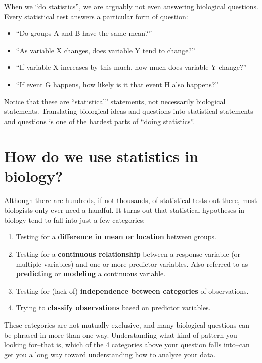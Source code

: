 \documentclass[
  13,
  letterpaper,
]{report}
\begin{document}
When we ``do statistics'', we are arguably not even answering biological
questions. Every statistical test answers a particular form of question:

\begin{itemize}
\item
  ``Do groups A and B have the same mean?''
\item
  ``As variable X changes, does variable Y tend to change?''
\item
  ``If variable X increases by this much, how much does variable Y
  change?''
\item
  ``If event G happens, how likely is it that event H also happens?''
\end{itemize}

Notice that these are ``statistical'' statements, not necessarily
biological statements. Translating biological ideas and questions into
statistical statements and questions is one of the hardest parts of
``doing statistics''.

\section{How do we use statistics in biology?}\label{sec-01-tests}

Although there are hundreds, if not thousands, of statistical tests out
there, most biologists only ever need a handful. It turns out that
statistical hypotheses in biology tend to fall into just a few
categories:

\begin{enumerate}
\def\labelenumi{\arabic{enumi}.}
\item
  Testing for a \textbf{difference in mean or location} between groups.
\item
  Testing for a \textbf{continuous relationship} between a response
  variable (or multiple variables) and one or more predictor variables.
  Also referred to as \textbf{predicting} or \textbf{modeling} a
  continuous variable.
\item
  Testing for (lack of) \textbf{independence between categories} of
  observations.
\item
  Trying to \textbf{classify observations} based on predictor variables.
\end{enumerate}

These categories are not mutually exclusive, and many biological
questions can be phrased in more than one way. Understanding what kind
of pattern you looking for--that is, which of the 4 categories above
your question falls into--can get you a long way toward understanding
how to analyze your data.
\end{document}
